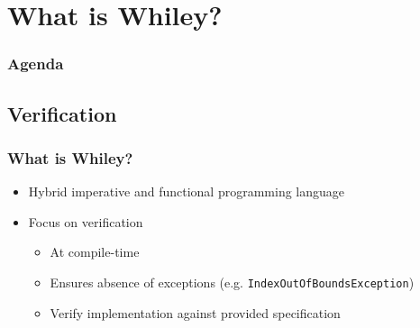 \section[Whiley]{What is Whiley?}

\begin{frame}
	\frametitle{Agenda}
\end{frame}

\subsection{Verification}
\begin{frame}
	\frametitle{What is Whiley?}
	\begin{itemize}
		\item Hybrid imperative and functional programming language
		\item Focus on verification
\pause
		\begin{itemize}
			\item At compile-time
			\item Ensures absence of exceptions (e.g. \texttt{IndexOutOfBoundsException})
			\item Verify implementation against provided specification
		\end{itemize}
	\end{itemize}
\end{frame}

